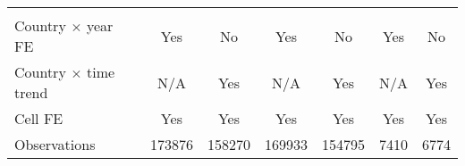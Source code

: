{\begin{tabular}{l*{6}{c}}
\hline \\ Country $\times$ year FE&         Yes         &          No         &         Yes         &          No         &         Yes         &          No         \\
Country $\times$ time trend&         N/A         &         Yes         &         N/A         &         Yes         &         N/A         &         Yes         \\
Cell FE             &         Yes         &         Yes         &         Yes         &         Yes         &         Yes         &         Yes         \\
Observations        &      173876         &      158270         &      169933         &      154795         &        7410         &        6774         \\
\hline\hline
\end{tabular}
}
